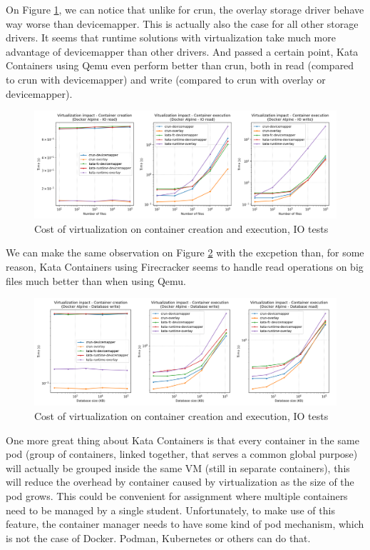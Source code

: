 On Figure \ref{fig:q3:virtualization:io}, we can notice that unlike for crun, the overlay storage driver behave way worse than devicemapper.  This is actually also the case for all other storage drivers. It seems that runtime solutions with virtualization take much more advantage of devicemapper than other drivers.  And passed a certain point, Kata Containers using Qemu even perform better than crun, both in read (compared to crun with devicemapper) and write (compared to crun with overlay or devicemapper).

\begin{figure}[h!]
  \begin{center}
    \includegraphics[width=\linewidth]{images/question-3-virtualization-io.png}
    \caption{Cost of virtualization on container creation and execution, IO tests}
    \label{fig:q3:virtualization:io}
  \end{center}
\end{figure}

We can make the same observation on Figure \ref{fig:q3:virtualization:db} with the excpetion than, for some reason, Kata Containers using Firecracker seems to handle read operations on big files much better than when using Qemu.

\begin{figure}[h!]
  \begin{center}
    \includegraphics[width=\linewidth]{images/question-3-virtualization-db.png}
    \caption{Cost of virtualization on container creation and execution, IO tests}
    \label{fig:q3:virtualization:db}
  \end{center}
\end{figure}

One more great thing about Kata Containers is that every container in the same pod (group of containers, linked together, that serves a common global purpose) will actually be grouped inside the same VM (still in separate containers), this will reduce the overhead by container caused by virtualization as the size of the pod grows.  This could be convenient for assignment where multiple containers need to be managed by a single student.  Unfortunately, to make use of this feature, the container manager needs to have some kind of pod mechanism, which is not the case of Docker.  Podman, Kubernetes or others can do that.
